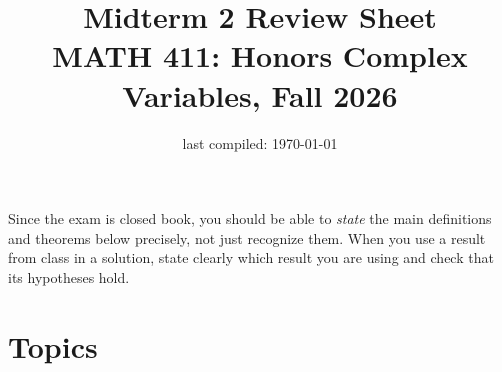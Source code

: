 \documentclass[12pt, reqno]{amsart}
\title{Midterm 2 Review Sheet \\ MATH 411: Honors Complex Variables, Fall 2026}
\date{last compiled: \today}
\theoremstyle{definition}
\numberwithin{equation}{subsection}
\begin{document}
\maketitle

\begin{center}\end{center}

\noindent Since the exam is closed book, you should be able to \emph{state} the main
definitions and theorems below precisely, not just recognize them. When you use
a result from class in a solution, state clearly which result you are using and
check that its hypotheses hold.


\section*{Topics}
\end{document}
